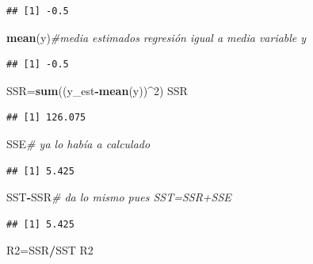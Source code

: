 \documentclass[
]{article}
\newenvironment{Shaded}{\begin{snugshade}}{\end{snugshade}}
\newcommand{\CommentTok}[1]{\textcolor[rgb]{0.56,0.35,0.01}{\textit{#1}}}
\newcommand{\DecValTok}[1]{\textcolor[rgb]{0.00,0.00,0.81}{#1}}
\newcommand{\KeywordTok}[1]{\textcolor[rgb]{0.13,0.29,0.53}{\textbf{#1}}}
\newcommand{\NormalTok}[1]{#1}
\newcommand{\OperatorTok}[1]{\textcolor[rgb]{0.81,0.36,0.00}{\textbf{#1}}}
\begin{document}
\begin{verbatim}
## [1] -0.5
\end{verbatim}

\begin{Shaded}
\begin{Highlighting}[]
\KeywordTok{mean}\NormalTok{(y)}\CommentTok{\#media estimados regresión igual a media variable y}
\end{Highlighting}
\end{Shaded}

\begin{verbatim}
## [1] -0.5
\end{verbatim}

\begin{Shaded}
\begin{Highlighting}[]
\NormalTok{SSR=}\KeywordTok{sum}\NormalTok{((y\_est}\OperatorTok{{-}}\KeywordTok{mean}\NormalTok{(y))}\OperatorTok{\^{}}\DecValTok{2}\NormalTok{)}
\NormalTok{SSR}
\end{Highlighting}
\end{Shaded}

\begin{verbatim}
## [1] 126.075
\end{verbatim}

\begin{Shaded}
\begin{Highlighting}[]
\NormalTok{SSE}\CommentTok{\# ya lo había a calculado}
\end{Highlighting}
\end{Shaded}

\begin{verbatim}
## [1] 5.425
\end{verbatim}

\begin{Shaded}
\begin{Highlighting}[]
\NormalTok{SST}\OperatorTok{{-}}\NormalTok{SSR}\CommentTok{\# da lo mismo pues SST=SSR+SSE }
\end{Highlighting}
\end{Shaded}

\begin{verbatim}
## [1] 5.425
\end{verbatim}

\begin{Shaded}
\begin{Highlighting}[]
\NormalTok{R2=SSR}\OperatorTok{/}\NormalTok{SST}
\NormalTok{R2}
\end{Highlighting}
\end{Shaded}
\end{document}
